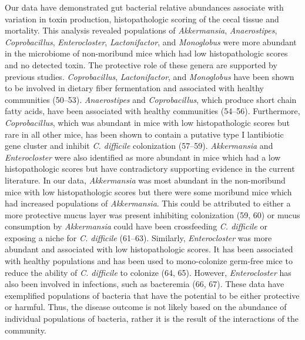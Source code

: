 \documentclass[
  12pt,
]{article}
\begin{document}
Our data have demonstrated gut bacterial relative abundances associate
with variation in toxin production, histopathologic scoring of the cecal
tissue and mortality. This analysis revealed populations of
\emph{Akkermansia}, \emph{Anaerostipes}, \emph{Coprobacillus},
\emph{Enterocloster}, \emph{Lactonifactor}, and \emph{Monoglobus} were
more abundant in the microbiome of non-moribund mice which had low
histopathologic scores and no detected toxin. The protective role of
these genera are supported by previous studies. \emph{Coprobacillus},
\emph{Lactonifactor}, and \emph{Monoglobus} have been shown to be
involved in dietary fiber fermentation and associated with healthy
communities (50--53). \emph{Anaerostipes} and \emph{Coprobacillus},
which produce short chain fatty acids, have been associated with healthy
communities (54--56). Furthermore, \emph{Coprobacillus}, which was
abundant in mice with low histopathologic scores but rare in all other
mice, has been shown to contain a putative type I lantibiotic gene
cluster and inhibit \emph{C. difficile} colonization (57--59).
\emph{Akkermansia} and \emph{Enterocloster} were also identified as more
abundant in mice which had a low histopathologic scores but have
contradictory supporting evidence in the current literature. In our
data, \emph{Akkermansia} was most abundant in the non-moribund mice with
low histopathologic scores but there were some moribund mice which had
increased populations of \emph{Akkermansia}. This could be attributed to
either a more protective mucus layer was present inhibiting colonization
(59, 60) or mucus consumption by \emph{Akkermansia} could have been
crossfeeding \emph{C. difficile} or exposing a niche for \emph{C.
difficile} (61--63). Similarly, \emph{Enterocloster} was more abundant
and associated with low histopathologic scores. It has been associated
with healthy populations and has been used to mono-colonize germ-free
mice to reduce the ability of \emph{C. difficile} to colonize (64, 65).
However, \emph{Enterocloster} has also been involved in infections, such
as bacteremia (66, 67). These data have exemplified populations of
bacteria that have the potential to be either protective or harmful.
Thus, the disease outcome is not likely based on the abundance of
individual populations of bacteria, rather it is the result of the
interactions of the community.
\end{document}
